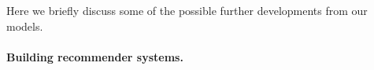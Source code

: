 Here we briefly discuss some of the possible further developments from our models.








\paragraph*{Building recommender systems.}


